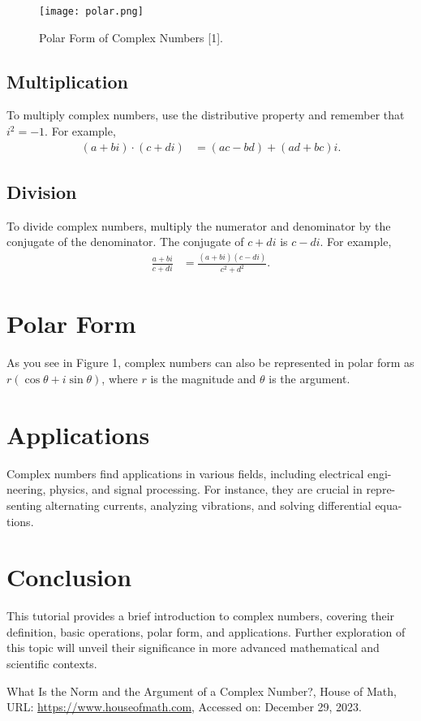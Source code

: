 \documentclass{article}
\begin{document}
\enlargethispage{\baselineskip} %

\begin{figure}
    \centering
    \texttt{[image: polar.png]}
    \caption{Polar Form of Complex Numbers [1].}
    \label{fig:enter-label}
\end{figure}

\subsection{Multiplication}
To multiply complex numbers, use the distributive property and remember that $i^2 = -1$. For example,
\begin{align*}
    (a + bi) \cdot (c + di) &= (ac - bd) + (ad + bc)i.
\end{align*}

\subsection{Division}
To divide complex numbers, multiply the numerator and denominator by the conjugate of the denominator. The conjugate of $c + di$ is $c - di$. For example,
\begin{align*}
    \frac{a + bi}{c + di} &= \frac{(a + bi)(c - di)}{c^2 + d^2}.
\end{align*}

\section{Polar Form}
As you see in Figure 1, complex numbers can also be represented in polar form as $r(\cos \theta + i \sin \theta)$, where $r$ is the magnitude and $\theta$ is the argument.

\section{Applications}
Complex numbers find applications in various fields, including electrical engi-
neering, physics, and signal processing. For instance, they are crucial in repre-
senting alternating currents, analyzing vibrations, and solving differential equa-
tions.
\newpage
	
\section*{Conclusion}
This tutorial provides a brief introduction to complex numbers, covering their definition, basic operations, polar form, and applications. Further exploration of this topic will unveil their significance in more advanced mathematical and scientific contexts.

\begin{thebibliography}{9}
    What Is the Norm and the Argument of a Complex Number?, House of Math, URL: \url{https://www.houseofmath.com}, Accessed on: December 29, 2023.
\end{thebibliography}
\end{document}
